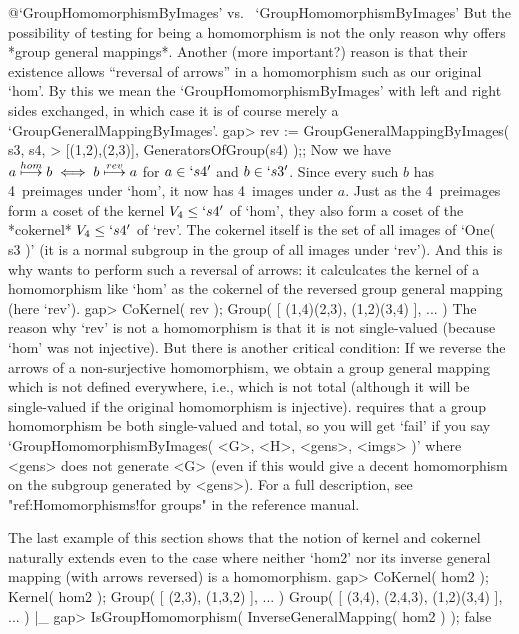 %
%
{@\noexpand `GroupHomomorphismByImages' vs.\ %
\noexpand `GroupHomomorphismByImages'}%
But the  possibility of testing for being  a homomorphism is not the only
reason  why    {\GAP} offers  *group   general  mappings*.  Another (more
important?) reason is that  their existence allows ``reversal of arrows''
in a  homomorphism such   as  our original  `hom'. By   this we mean  the
`GroupHomomorphismByImages' with left and right sides exchanged, in which
case it is of course merely a `GroupGeneralMappingByImages'.
\beginexample
    gap> rev := GroupGeneralMappingByImages( s3, s4,
    >           [(1,2),(2,3)], GeneratorsOfGroup(s4) );;
\endexample
Now we      have  $a\buildrel  hom\over\longmapsto  b    \iff  b\buildrel
rev\over\longmapsto a$ for $a\in `s4'$ and  $b\in `s3'$. Since every such
$b$ has 4~preimages  under `hom', it now  has 4~images under $a$. Just as
the 4~preimages form a  coset of the kernel $V_4\le  `s4'$ of `hom', they
also form a coset of the *cokernel*  $V_4\le `s4'$ of `rev'. The cokernel
itself is the set of all images of  `One( s3 )' (it  is a normal subgroup
in the group of all images under `rev'). And  this is why {\GAP} wants to
perform such  a  reversal of  arrows:  it calculcates   the  kernel of  a
homomorphism like `hom'  as the  cokernel of  the  reversed group general
mapping (here `rev').
\beginexample
    gap> CoKernel( rev );
    Group( [ (1,4)(2,3), (1,2)(3,4) ], ... )
\endexample
{}%
%
The  reason  why  `rev'   is not  a    homomorphism is  that   it is  not
single-valued  (because `hom' was   not injective). But there  is another
critical  condition: If   we   reverse the arrows   of  a  non-surjective
homomorphism,  we  obtain a group  general mapping  which  is not defined
everywhere, i.e.,  which is not total  (although it will be single-valued
if the original homomorphism is  injective). {\GAP} requires that a group
homomorphism be  both  single-valued  and total,
so you will get `fail' if you say
`GroupHomomorphismByImages( <G>, <H>, <gens>, <imgs> )' where <gens> does
not generate <G> (even if this would give a decent homomorphism on the
subgroup generated by <gens>).  For a full description,
see "ref:Homomorphisms!for groups" in the reference manual.

The last  example of this   section shows that  the  notion of kernel and
cokernel naturally extends even to the case  where neither `hom2' nor its
inverse general mapping (with arrows reversed) is a homomorphism.
\beginexample
    gap> CoKernel( hom2 );  Kernel( hom2 );
    Group( [ (2,3), (1,3,2) ], ... )
    Group( [ (3,4), (2,4,3), (1,2)(3,4) ], ... )
|_
    gap> IsGroupHomomorphism( InverseGeneralMapping( hom2 ) );
    false
\endexample

